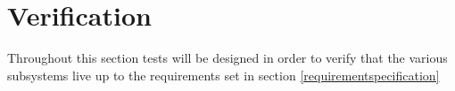 
\section{Verification}
Throughout this section tests will be designed in order to verify that the various subsystems live up to the requirements set in section \ref{requirementspecification}

